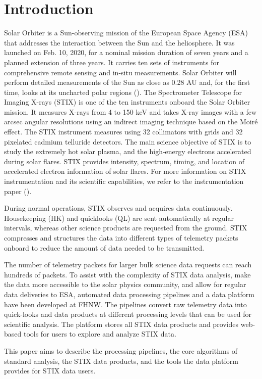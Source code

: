 \documentclass[referee]{aa} %
\begin{document}
\section{Introduction}
Solar Orbiter is a Sun-observing mission of the European Space Agency (ESA) that 
addresses the interaction between the Sun and the heliosphere. It was launched on Feb. 10, 2020, for a nominal mission duration of seven years and a planned 
extension of three years. It carries ten sets of instruments for comprehensive
remote sensing and in-situ measurements.
Solar Orbiter will perform detailed measurements of the Sun as close as 0.28 AU and, for the first time, looks at its uncharted polar regions (\cite{SolarOrbiter2020}).  
The Spectrometer Telescope for Imaging X-rays (STIX) is one of the ten instruments onboard the Solar Orbiter mission.  
It measures X-rays from 4 to 150 keV and takes X-ray images with a few arcsec angular resolutions using an indirect imaging technique based on the Moiré effect. The STIX instrument measures using 32 collimators with grids and 32 pixelated cadmium telluride detectors. The main science objective of STIX is to study the extremely hot solar plasma, and the high-energy electrons accelerated during solar flares. STIX provides intensity, spectrum, timing, and location of accelerated electron information of solar flares. For more information on STIX instrumentation and its scientific capabilities, we refer to the instrumentation paper (\cite{stixinstrument}).

During normal operations, STIX observes and acquires data continuously. Housekeeping (HK) and quicklooks (QL) are sent automatically at regular intervals, whereas other science products are requested from the ground. STIX compresses and structures the data into different types of telemetry packets onboard to reduce the amount of data needed to be transmitted.

The number of telemetry packets for larger bulk science data requests can reach hundreds of packets. To assist with the complexity of STIX data analysis, make the data more accessible to the solar physics community, and allow for regular data deliveries to ESA, automated data processing pipelines and a data platform have been developed at FHNW. The pipelines convert raw telemetry data into quick-looks and data products at different processing levels that can be used for scientific analysis. The platform stores all STIX data products and provides web-based tools for users to explore and analyze STIX data.

 This paper aims to describe the processing pipelines, the core algorithms of standard analysis, the STIX data products, and the tools the data platform provides for STIX data users.
\end{document}
